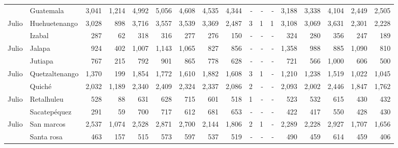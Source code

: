 \begin{landscape}
\begin{center}
\begin{longtable}{llrrrrrrrrrrrrrrr}
			\rowcolor{color1!5!white}\multicolumn{1}{l}{	\footnotesize	 Julio 	}&	 Guatemala 	&	 3,041 	&	 1,214 	&	 4,992 	&	 5,056 	&	 4,608 	&	 4,535 	&	 4,344 	&	 -   	&	 -   	&	 -   	&	 3,188 	&	 3,338 	&	 4,104 	&	 2,449 	&	 2,505 	\\
			\multicolumn{1}{l}{	\footnotesize	 Julio 	}&	 Huehuetenango 	&	 3,028 	&	 898 	&	 3,716 	&	 3,557 	&	 3,539 	&	 3,369 	&	 2,487 	&	 3 	&	 1 	&	 1 	&	 3,108 	&	 3,069 	&	 3,631 	&	 2,301 	&	 2,228 	\\
			\rowcolor{color1!5!white}\multicolumn{1}{l}{	\footnotesize	 Julio 	}&	 Izabal 	&	 287 	&	 62 	&	 318 	&	 316 	&	 277 	&	 276 	&	 150 	&	 -   	&	 -   	&	 -   	&	 324 	&	 280 	&	 356 	&	 247 	&	 189 	\\
			\multicolumn{1}{l}{	\footnotesize	 Julio 	}&	 Jalapa 	&	 924 	&	 402 	&	 1,007 	&	 1,143 	&	 1,065 	&	 827 	&	 856 	&	 -   	&	 -   	&	 -   	&	 1,358 	&	 988 	&	 885 	&	 1,090 	&	 810 	\\
			\rowcolor{color1!5!white}\multicolumn{1}{l}{	\footnotesize	 Julio 	}&	 Jutiapa 	&	 767 	&	 215 	&	 792 	&	 901 	&	 865 	&	 778 	&	 628 	&	 -   	&	 -   	&	 -   	&	 721 	&	 566 	&	 1,000 	&	 606 	&	 500 	\\
			\multicolumn{1}{l}{	\footnotesize	 Julio 	}&	 Quetzaltenango 	&	 1,370 	&	 199 	&	 1,854 	&	 1,772 	&	 1,610 	&	 1,882 	&	 1,608 	&	 3 	&	 1 	&	 -   	&	 1,210 	&	 1,238 	&	 1,519 	&	 1,022 	&	 1,045 	\\
			\rowcolor{color1!5!white}\multicolumn{1}{l}{	\footnotesize	 Julio 	}&	 Quiché 	&	 2,032 	&	 1,189 	&	 2,340 	&	 2,409 	&	 2,324 	&	 2,337 	&	 2,086 	&	 2 	&	 -   	&	 -   	&	 2,093 	&	 2,002 	&	 2,446 	&	 1,847 	&	 1,762 	\\
			\multicolumn{1}{l}{	\footnotesize	 Julio 	}&	 Retalhuleu 	&	 528 	&	 88 	&	 631 	&	 628 	&	 715 	&	 601 	&	 518 	&	 1 	&	 -   	&	 -   	&	 523 	&	 532 	&	 615 	&	 430 	&	 432 	\\
			\rowcolor{color1!5!white}\multicolumn{1}{l}{	\footnotesize	 Julio 	}&	 Sacatepéquez 	&	 291 	&	 59 	&	 700 	&	 717 	&	 612 	&	 681 	&	 653 	&	 -   	&	 -   	&	 -   	&	 422 	&	 417 	&	 550 	&	 428 	&	 430 	\\
			\multicolumn{1}{l}{	\footnotesize	 Julio 	}&	 San marcos 	&	 2,537 	&	 1,074 	&	 2,528 	&	 2,871 	&	 2,700 	&	 2,144 	&	 1,806 	&	 2 	&	 1 	&	 -   	&	 2,289 	&	 2,228 	&	 2,927 	&	 1,707 	&	 1,656 	\\
			\rowcolor{color1!5!white}\multicolumn{1}{l}{	\footnotesize	 Julio 	}&	 Santa rosa 	&	 463 	&	 157 	&	 515 	&	 573 	&	 597 	&	 537 	&	 519 	&	 -   	&	 -   	&	 -   	&	 490 	&	 459 	&	 614 	&	 459 	&	 406 	\\

\end{longtable}
\end{center}
\end{landscape}
